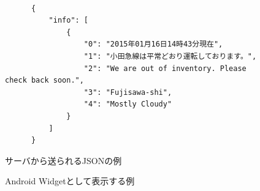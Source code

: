 \begin{figure}[htbp]
  \begin{minipage}{\hsize}
    \begin{center}
      \begin{lstlisting}[basicstyle=\ttfamily\footnotesize, frame=single]

      {
          "info": [
              {
                  "0": "2015年01月16日14時43分現在",
                  "1": "小田急線は平常どおり運転しております。",
                  "2": "We are out of inventory. Please check back soon.",
                  "3": "Fujisawa-shi",
                  "4": "Mostly Cloudy"
              }
          ]
      }

      \end{lstlisting}
    \end{center}
    \caption{サーバから送られるJSONの例}
    \label{fig:JSON}
  \end{minipage}
\end{figure}

\begin{figure}[htbp]
  \begin{minipage}{\hsize}
    \begin{center}
    \end{center}
    \caption{Android Widgetとして表示する例}
    \label{fig:widget}
  \end{minipage}
\end{figure}

\nocite{*}
